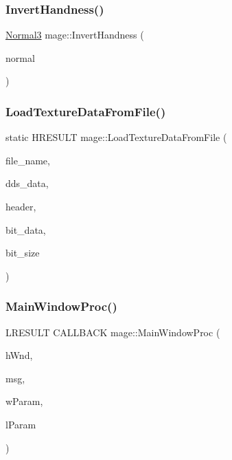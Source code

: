 \subsubsection{\texorpdfstring{Invert\+Handness()}{InvertHandness()}\hspace{0.1cm}{\footnotesize\ttfamily [4/4]}}
{\footnotesize\ttfamily \hyperlink{structmage_1_1_normal3}{Normal3} mage\+::\+Invert\+Handness (\begin{DoxyParamCaption}\item[{const \hyperlink{structmage_1_1_normal3}{Normal3} \&}]{normal }\end{DoxyParamCaption})}

\hypertarget{namespacemage_ad1df9b8a27dd30528717777fd0c9c3db}{}\label{namespacemage_ad1df9b8a27dd30528717777fd0c9c3db} 
\subsubsection{\texorpdfstring{Load\+Texture\+Data\+From\+File()}{LoadTextureDataFromFile()}}
{\footnotesize\ttfamily static H\+R\+E\+S\+U\+LT mage\+::\+Load\+Texture\+Data\+From\+File (\begin{DoxyParamCaption}\item[{\+\_\+\+In\+\_\+z\+\_\+ const wchar\+\_\+t $\ast$}]{file\+\_\+name,  }\item[{std\+::unique\+\_\+ptr$<$ uint8\+\_\+t\mbox{[}$\,$\mbox{]}$>$ \&}]{dds\+\_\+data,  }\item[{\hyperlink{structmage_1_1_d_d_s___h_e_a_d_e_r}{D\+D\+S\+\_\+\+H\+E\+A\+D\+ER} $\ast$$\ast$}]{header,  }\item[{uint8\+\_\+t $\ast$$\ast$}]{bit\+\_\+data,  }\item[{size\+\_\+t $\ast$}]{bit\+\_\+size }\end{DoxyParamCaption})\hspace{0.3cm}{\ttfamily [static]}}

\hypertarget{namespacemage_a7ab7652c75189226bf8299647e897c99}{}\label{namespacemage_a7ab7652c75189226bf8299647e897c99} 
\subsubsection{\texorpdfstring{Main\+Window\+Proc()}{MainWindowProc()}}
{\footnotesize\ttfamily L\+R\+E\+S\+U\+LT C\+A\+L\+L\+B\+A\+CK mage\+::\+Main\+Window\+Proc (\begin{DoxyParamCaption}\item[{H\+W\+ND}]{h\+Wnd,  }\item[{U\+I\+NT}]{msg,  }\item[{W\+P\+A\+R\+AM}]{w\+Param,  }\item[{L\+P\+A\+R\+AM}]{l\+Param }\end{DoxyParamCaption})}

